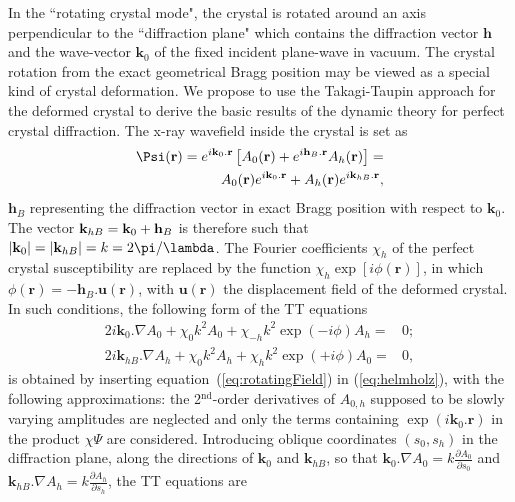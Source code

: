 \documentclass{iucr}
\begin{document}
In the ``rotating crystal mode", the crystal is rotated around an axis perpendicular to the ``diffraction plane" which contains the diffraction vector $\textbf{h}$ and the wave-vector $\textbf{k}_0$ of the fixed incident plane-wave in vacuum. The crystal rotation from the exact geometrical Bragg position may be viewed as a special kind of crystal deformation. We propose to use the Takagi-Taupin approach for the deformed crystal to derive the basic results of the dynamic theory for perfect crystal diffraction. 
The x-ray wavefield inside the crystal is set as
\begin{subequations}\label{eq:rotatingField}
\label{eq:wavefieldappendix}
\begin{align}
        \Psi(\textbf r) = 
        e^{i \textbf k_0 . \textbf r} \left[
        A_0(\textbf r) + e^{i \textbf{h}_B . \textbf r} A_h(\textbf r)
        \right] = 
        \nonumber\\
        A_0(\textbf r) e^{i \textbf k_0 . \textbf r} + A_{h}(\textbf r) e^{i \textbf k_{hB} . \textbf r},
\end{align}
\end{subequations}
$\textbf{h}_B$ representing the diffraction vector in exact Bragg position with respect to $\textbf{k}_0$. The vector $\textbf k_{hB}= \textbf{k}_0 + \textbf{h}_B$  is therefore such that $|\textbf k_{0}|=|\textbf k_{hB}|=k=2 \pi / \lambda$. The Fourier coefficients $\chi_h$ of the perfect crystal susceptibility are replaced by the function $\chi_h \exp[i\phi(\textbf{r})]$, in which $\phi(\textbf{r}) = - \textbf{h}_B . \textbf{u}(\textbf{r})$, 
with $\textbf{u}(\textbf{r})$ the displacement field of the deformed crystal. In such conditions, the following form of the TT equations
\begin{subequations}
\label{eq:TTvectorappendix}
\begin{align}
2 i \textbf{k}_0 . \nabla A_0 + \chi_0 k^2 A_0 + \chi_{-h} k^2 \exp(-i\phi) A_h =& 0; \nonumber \\
2 i \textbf{k}_{hB} . \nabla A_h + \chi_0 k^2 A_h + \chi_{h} k^2 \exp(+i\phi) A_0 =& 0, \nonumber
\end{align}
\end{subequations}
is obtained by inserting equation~(\ref{eq:rotatingField}) in (\ref{eq:helmholz}), with the following approximations: the 2$^{\text{nd}}$-order derivatives of $A_{0,h}$ supposed to be slowly varying amplitudes are neglected and only the terms containing $\exp(i\textbf{k}_0.\textbf{r})$ in the product $\chi\Psi$ are considered. Introducing oblique coordinates $(s_0,s_h)$ in the diffraction plane, along the directions of $\textbf{k}_0$ and $\textbf{k}_{hB}$, so that $\textbf{k}_0.\nabla A_0=k\frac{\partial A_0}{\partial s_0}$ and  $\textbf{k}_{hB}.\nabla A_h=k\frac{\partial A_h}{\partial s_h}$, the TT equations are
\end{document}
